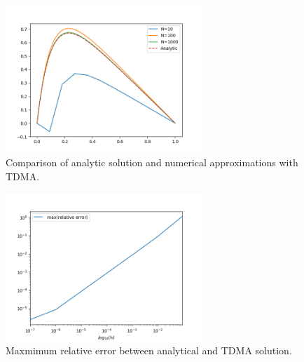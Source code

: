 \begin{figure}[htp]
  \centering
  \includegraphics[width=0.66\textwidth]{../figures/TDMA.png}
  \caption{Comparison of analytic solution and numerical approximations with TDMA.}
  \label{fig:a}
\end{figure}


\begin{figure}[htp]
  \centering
  \includegraphics[width=0.66\textwidth]{../figures/relative_error.png}
  \caption{Maxmimum relative error between analytical and TDMA solution.}
  \label{fig:relative_error}
\end{figure}
